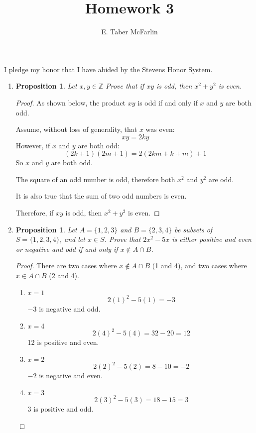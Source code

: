 \documentclass[12pt,a4paper,reqno,parskip=full]{amsart}
\numberwithin{equation}{section}
\theoremstyle{plain}
\newtheorem{proposition}[subsection]{Proposition}
\theoremstyle{definition}
\begin{document}
\title{Homework 3}

\author{E. Taber McFarlin}

\maketitle

I pledge my honor that I have abided by the Stevens Honor System.

\renewcommand{\labelenumii}{\roman{enumii}}
\begin{enumerate}
  \item
        \begin{proposition}
          Let $x, y \in \mathbb{Z}$ Prove that if $xy$ is odd, then $x^2 + y^2$ is even.
        \end{proposition}

        \begin{proof}
          As shown below, the product $xy$ is odd if and only if $x$ and $y$ are both odd.

          Assume, without loss of generality, that $x$ was even:
          \[xy = 2ky\]
          However, if $x$ and $y$ are both odd:
          \[(2k + 1)(2m + 1) = 2(2km + k + m) + 1\]
          So $x$ and $y$ are both odd.

          The square of an odd number is odd, therefore both $x^2$ and $y^2$ are odd.

          It is also true that the sum of two odd numbers is even.

          Therefore, if $xy$ is odd, then $x^2 + y^2$ is even.

        \end{proof}

  \item
        \begin{proposition}
          Let $A=\{1,2,3\}$ and $B=\{2,3,4\}$ be subsets of $S=\{1,2,3,4\}$, and let $x\in S$.
          Prove that $2x^2-5x$ is either positive and even or negative and odd
          if and only if $x\not\in A\cap B$.
        \end{proposition}
        \begin{proof}
          There are two cases where $x \notin A\cap B$ (1 and 4),
          and two cases where $x \in A\cap B$ (2 and 4).

          \begin{enumerate}
            \item $x = 1$
                  \[2(1)^2 - 5(1) = -3\]
                  $-3$ is negative and odd.
            \item $x = 4$
                  \[2(4)^2 - 5(4) = 32 - 20 = 12\]
                  12 is positive and even.
            \item $x = 2$
                  \[2(2)^2 - 5(2) = 8 - 10 = -2\]
                  $-2$ is negative and even.
            \item $x = 3$
                  \[2(3)^2 - 5(3) = 18 - 15 = 3\]
                  3 is positive and odd.
          \end{enumerate}


\end{proof}
\end{enumerate}
\end{document}
